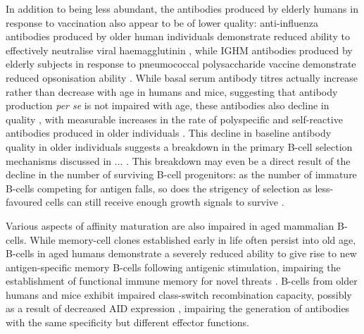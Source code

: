 In addition to being less abundant, the antibodies produced by elderly humans in response to vaccination also appear to be of lower quality: anti-influenza antibodies produced by older human individuals demonstrate reduced ability to effectively neutralise viral haemagglutinin \parencite{sasaki2011limited,kogut2012bcells}, while IGHM antibodies produced by elderly subjects in response to pneumococcal polysaccharide vaccine demonstrate reduced opsonisation ability \parencite{kogut2012bcells}. While basal serum antibody titres actually increase rather than decrease with age in humans and mice, %
suggesting that antibody production \textit{per se} is not impaired with age,
these antibodies also decline in quality \parencite{montecino2013immunosenescence}, with measurable increases in the rate of polyspecific and self-reactive antibodies produced in older individuals \parencite{kogut2012bcells}. %
This decline in baseline antibody quality in older individuals suggests a breakdown in the primary B-cell selection mechanisms discussed in ... . This breakdown may even be a direct result of the decline in the number of surviving B-cell progenitors: as the number of immature B-cells competing for antigen falls, so does the strigency of selection as less-favoured cells can still receive enough growth signals to survive \parencite{ademokun2010ageing}. %

Various aspects of affinity maturation are also impaired in aged mammalian B-cells. While memory-cell clones established early in life often persist into old age, \naive B-cells in aged humans demonstrate a severely reduced ability to give rise to new antigen-specific memory B-cells following antigenic stimulation, impairing the establishment of functional immune memory for novel threats \parencite{aberle2013mechanistic}. B-cells from older humans and mice exhibit impaired class-switch recombination capacity, possibly as a result of decreased AID expression \parencite{montecino2013immunosenescence,blomberg2013age,frasca2011age}, impairing the generation of antibodies with the same specificity but different effector functions.








